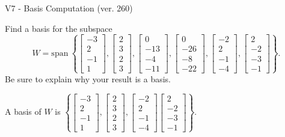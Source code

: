 \begin{exercise}
  \begin{exerciseTitle}V7 - Basis Computation (ver. 260)\end{exerciseTitle}
  \begin{exerciseStatement}
    Find a basis for the subspace 
\[W=\mathrm{span}\ \left\{\left[\begin{array}{r}
-3 \\
2 \\
-1 \\
1
\end{array}\right] , \left[\begin{array}{r}
2 \\
3 \\
2 \\
3
\end{array}\right] , \left[\begin{array}{r}
0 \\
-13 \\
-4 \\
-11
\end{array}\right] , \left[\begin{array}{r}
0 \\
-26 \\
-8 \\
-22
\end{array}\right] , \left[\begin{array}{r}
-2 \\
2 \\
-1 \\
-4
\end{array}\right] , \left[\begin{array}{r}
2 \\
-2 \\
-3 \\
-1
\end{array}\right]\right\}.\]
 Be sure to explain why your result is a basis.


  \end{exerciseStatement}
  \begin{exerciseAnswer}
   A basis of \(W\) is  \(\left\{\left[\begin{array}{r}
-3 \\
2 \\
-1 \\
1
\end{array}\right] , \left[\begin{array}{r}
2 \\
3 \\
2 \\
3
\end{array}\right] , \left[\begin{array}{r}
-2 \\
2 \\
-1 \\
-4
\end{array}\right] \left[\begin{array}{r}
2 \\
-2 \\
-3 \\
-1
\end{array}\right]\right\}\).
  


  \end{exerciseAnswer}
\end{exercise}